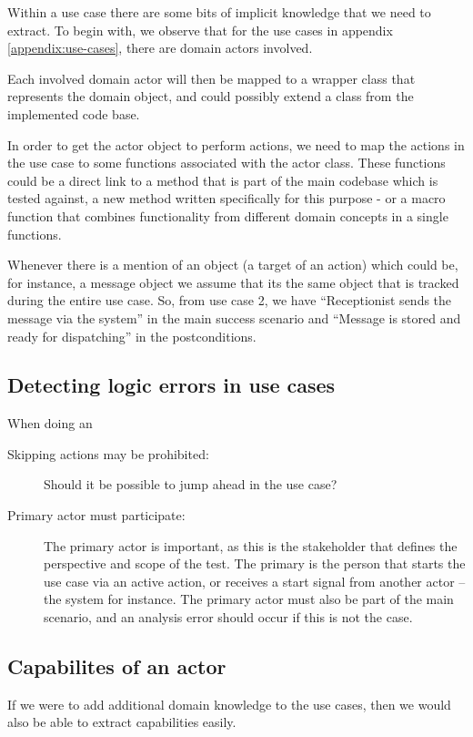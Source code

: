 Within a use case there are some bits of implicit knowledge that we need to extract. To begin with, we observe that for the use cases in appendix \ref{appendix:use-cases}, there are domain actors involved.

Each involved domain actor will then be mapped to a wrapper class that represents the domain object, and could possibly extend a class from the implemented code base.

In order to get the actor object to perform actions, we need to map the actions in the use case to some functions associated with the actor class. These functions could be a direct link to a method that is part of the main codebase which is tested against, a new method written specifically for this purpose - or a macro function that combines functionality from different domain concepts in a single functions.

Whenever there is a mention of an object (a target of an action) which could be, for instance, a message object we assume that its the same object that is tracked during the entire use case. So, from use case 2, we have ``Receptionist sends the message via the system'' in the main success scenario and ``Message is stored and ready for dispatching'' in the postconditions.

\subsection{Detecting logic errors in use cases}
When doing an
\begin{description}
  \item[Skipping actions may be prohibited:] Should it be possible to jump ahead in the use case?
  \item[Primary actor must participate:] The primary actor is important, as this is the stakeholder that defines the perspective and scope of the test. The primary is the person that starts the use case via an active action, or receives a start signal from another actor -- the system for instance. The primary actor must also be part of the main scenario, and an analysis error should occur if this is not the case.

\end{description}
\subsection{Capabilites of an actor}
If we were to add additional domain knowledge to the use cases, then we would also be able to extract capabilities easily.

